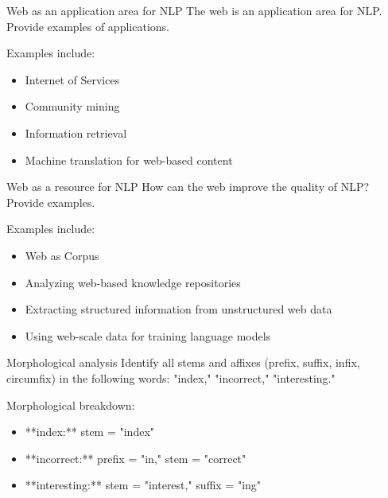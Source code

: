 \documentclass{article}
\author{Leopold Lemmermann}
\begin{document}
\createtitle


\begin{exercise}{Web as an application area for NLP}
  The web is an application area for NLP. Provide examples of applications.

  \begin{solution}
    Examples include:
    \begin{itemize}
        \item Internet of Services
        \item Community mining
        \item Information retrieval
        \item Machine translation for web-based content
    \end{itemize}
  \end{solution}
\end{exercise}

\begin{exercise}{Web as a resource for NLP}
  How can the web improve the quality of NLP? Provide examples.

  \begin{solution}
    Examples include:
    \begin{itemize}
        \item Web as Corpus
        \item Analyzing web-based knowledge repositories
        \item Extracting structured information from unstructured web data
        \item Using web-scale data for training language models
    \end{itemize}
  \end{solution}
\end{exercise}

\begin{exercise}{Morphological analysis}
  Identify all stems and affixes (prefix, suffix, infix, circumfix) in the following words: "index," "incorrect," "interesting."

  \begin{solution}
    Morphological breakdown:
    \begin{itemize}
        \item **index:** stem = "index"
        \item **incorrect:** prefix = "in," stem = "correct"
        \item **interesting:** stem = "interest," suffix = "ing"
    \end{itemize}
  \end{solution}
\end{exercise}
\end{document}
